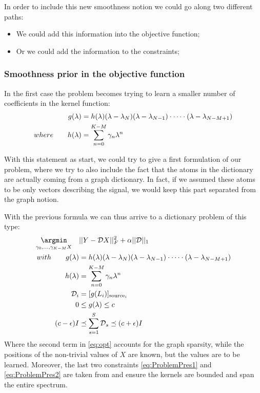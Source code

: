 In order to include this new smoothness notion we could go along two different paths:
\begin{itemize}
\item We could add this information into the objective function;
\item Or we could add the information to the constraints;
\end{itemize}

\subsubsection{Smoothness prior in the objective function}
In the first case the problem becomes trying to learn a smaller number of coefficients in the kernel function:
\begin{align}
g(\lambda) &= h(\lambda)(\lambda - \lambda_N)(\lambda - \lambda_{N-1})\cdot \dots \cdot (\lambda - \lambda_{N-M+1}) \label{eq:polynom}\\
where \qquad h(\lambda) &= \sum_{n=0}^{K-M}\gamma_n\lambda^{n} \notag
\end{align}

With this statement as start, we could try to give a first formulation of our problem, where we try to also include the fact that the atoms in the dictionary are actually coming from a graph dictionary. In fact, if we assumed these atoms to be only vectors describing the signal, we would keep this part separated from the graph notion.

With the previous formula we can thus arrive to a dictionary problem of this type:
\begin{align}
\underset{{\gamma_0,\dots,\gamma_{K-M}X}}{\argmin} \quad& ||Y - \mathcal{D}X||^2_F + \alpha||\mathcal{D}||_1 \label{eq:opt}\\
with \qquad g(\lambda) &= h(\lambda)(\lambda - \lambda_N)(\lambda - \lambda_{N-1})\cdot \dots \cdot (\lambda - \lambda_{N-M+1}) \notag\\
h(\lambda) &= \sum_{n=0}^{K-M}\gamma_n\lambda^{n} \notag\\
\mathcal{D}_i &= [g(L_i)]_{\text{source}_i} \notag\\
0 &\leq g(\lambda) \leq c \label{eq:ProblemPres1}\\
(c-\epsilon)I &\preceq \sum_{s=1}^{S}\mathcal{D}_s \preceq (c+\epsilon)I \label{eq:ProblemPres2}
\end{align}
Where the second term in \autoref{eq:opt} accounts for the graph sparsity, while the positions of the non-trivial values of $X$ are known, but the values are to be learned. Moreover, the last two constraints \autoref{eq:ProblemPres1} and \autoref{eq:ProblemPres2} are taken from \cite{Thanou2014} and ensure the kernels are bounded and span the entire spectrum.
\label{sec:DictionaryLearningSection}

